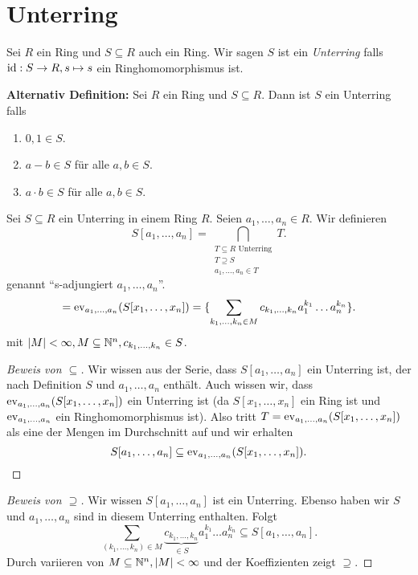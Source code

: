 \section{Unterring}
\begin{definition}
	Sei $R$ ein Ring und $S \subseteq R$ auch ein Ring. Wir sagen $S$ ist ein \emph{Unterring} falls $\operatorname{id}: S \to R, s \mapsto s$ 
	ein Ringhomomorphismus ist.
	
	\textbf{Alternativ Definition:}
	Sei $R$ ein Ring und $S \subseteq R$. Dann ist $S$ ein Unterring falls
	\begin{enumerate}
		\item $0,1 \in S$.
		\item $a-b \in S$ für alle $a,b \in S$.
		\item $a\cdot b \in S$ für alle $a,b \in S$.
	\end{enumerate}
\end{definition}

\begin{notation}
	Sei $S \subseteq R$ ein Unterring in einem Ring $R$.
	Seien $a_1,\ldots,a_{n} \in R$. Wir definieren
	\[
		S[a_1,\ldots,a_{n}] = \bigcap_{\substack{T \subseteq R \text{ Unterring}\\ T \supseteq S\\ a_1,\ldots,a_{n} \in T}} T 
	.\] 
	genannt \enquote{s-adjungiert $a_1,\ldots,a_{n}$}.
	\[
	= \operatorname{ev}_{a_1,\ldots,a_{n}}(S[x_1,\ldots,x_{n}]) = \{\sum_{k_1,\ldots,k_{n} \in M} c_{k_1,\ldots,k_{n}} a_1^{k_1} \ldots a_{n}^{k_{n}} \} 
	.\] 
	mit $\abs{M} < \infty, M \subseteq \mathbb{N}^{n}, c_{k_1,\ldots,k_{n}} \in S$.
\end{notation}

\begin{proof}[Beweis von $\subseteq$]
	Wir wissen aus der Serie, dass $S[a_1,\ldots,a_{n}]$ ein Unterring ist, der nach Definition $S$ und $a_1,\ldots,a_{n}$ enthält.
	Auch wissen wir, dass $\operatorname{ev}_{a_1,\ldots,a_{n}}(S[x_1,\ldots,x_{n}])$ ein Unterring ist (da $S[x_1,\ldots,x_{n}]$ ein Ring ist und $\operatorname{ev}_{a_1,\ldots,a_{n}}$ ein Ringhomomorphismus ist).
	Also tritt $T = \operatorname{ev}_{a_1,\ldots,a_{n}}(S[x_1,\ldots,x_{n}])$ als eine der Mengen im Durchschnitt auf und wir erhalten
	\[
		S[a_1,\ldots,a_{n}] \subseteq \operatorname{ev}_{a_1,\ldots,a_{n}}(S[x_1,\ldots,x_{n}])
	.\] 
\end{proof}

\begin{proof}[Beweis von $\supseteq$]
	Wir wissen $S[a_1,\ldots,a_{n}]$ ist ein Unterring.
	Ebenso haben wir $S$ und $a_1,\ldots,a_{n}$ sind in diesem Unterring enthalten. Folgt
	\[
		\sum_{(k_1,\ldots,k_{n}) \in M} \underbrace{c_{k_1,\ldots,k_{n}}}_{\in S} a_1^{k_1} \ldots a_{n}^{k_{n}} \subseteq S[a_1,\ldots,a_{n}]
	.\] 
	Durch variieren von $M \subseteq \mathbb{N}^{n}, \abs{M} < \infty$ und der Koeffizienten zeigt $\supseteq$.
\end{proof}

